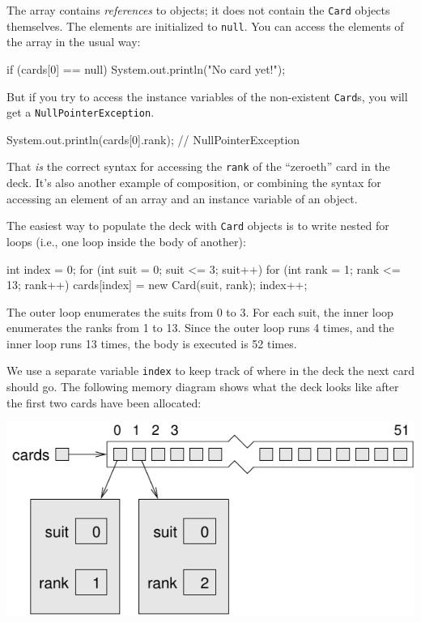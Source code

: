 \documentclass[12pt]{book}
\theoremstyle{exercise}
\newcommand{\java}[1]{\verb"#1"}
\newcommand{\java}[1]{\lstinline{#1}} %
\begin{document}

The array contains {\em references} to objects; it does not contain the \java{Card} objects themselves.
The elements are initialized to \java{null}.
You can access the elements of the array in the usual way:

\begin{code}
    if (cards[0] == null) {
        System.out.println("No card yet!");
    }
\end{code}


But if you try to access the instance variables of the non-existent \java{Card}s, you will get a \java{NullPointerException}.

\begin{code}
    System.out.println(cards[0].rank);  // NullPointerException
\end{code}


That {\em is} the correct syntax for accessing the \java{rank} of the ``zeroeth'' card in the deck.
It's also another example of composition, or combining the syntax for accessing an element of an array and an instance variable of an object.


The easiest way to populate the deck with \java{Card} objects is to write nested for loops (i.e., one loop inside the body of another):

\begin{code}
    int index = 0;
    for (int suit = 0; suit <= 3; suit++) {
        for (int rank = 1; rank <= 13; rank++) {
            cards[index] = new Card(suit, rank);
            index++;
        }
    }
\end{code}

The outer loop enumerates the suits from 0 to 3.
For each suit, the inner loop enumerates the ranks from 1 to 13.
Since the outer loop runs 4 times, and the inner loop runs 13 times, the body is executed is 52 times.


We use a separate variable \java{index} to keep track of where in the deck the next card should go.
The following memory diagram shows what the deck looks like after the first two cards have been allocated:

\begin{center}
\includegraphics{figs/cardarray2.pdf}
\end{center}
\end{document}

